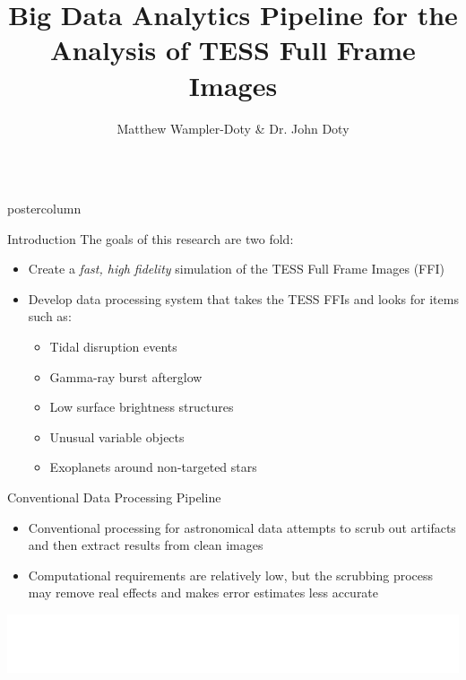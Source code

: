 \documentclass[final,hyperref={pdfpagelabels=false}]{beamer}
\title{\LARGE Big Data Analytics Pipeline for the Analysis of TESS Full Frame Images}
\author{Matthew Wampler-Doty \& Dr. John Doty}
\institute[Noqsi Aerospace]{Noqsi Aerospace, Ltd. \& MIT}
\date[]{}
\newlength{\columnheight}
\begin{document}
\begin{frame}
  \begin{columns}
    \begin{column}{.49\textwidth}
      \begin{beamercolorbox}[center,wd=\textwidth]{postercolumn}
        \begin{minipage}[T]{.95\textwidth}  %
          \parbox[t][\columnheight]{\textwidth}{
            \begin{block}{Introduction}
            The goals of this research are two fold:
              \begin{itemize}
              \item Create a \emph{fast, high fidelity} simulation of the TESS Full Frame Images (FFI)
              \item Develop data processing system that takes the TESS FFIs and looks for items such as:
              \begin{itemize}
              	\item Tidal disruption events
	        \item Gamma-ray burst afterglow
		\item Low surface brightness structures
		\item Unusual variable objects
		\item Exoplanets around non-targeted stars
              \end{itemize}
              \end{itemize}              
            \end{block}

            \vspace{2cm}
            \begin{block}{Conventional Data Processing Pipeline}
            \begin{itemize}
              	\item Conventional processing for astronomical data attempts to scrub out artifacts and then extract results from clean images
		\item Computational requirements are relatively low, but the scrubbing process may remove real effects and makes error estimates less accurate
	    \end{itemize}
              \includegraphics[width=0.95\linewidth]{figures/Conventional_Pipeline.pdf}
            \end{block}

}
\end{minipage}
\end{beamercolorbox}
\end{column}
\end{columns}
\end{frame}
\end{document}
